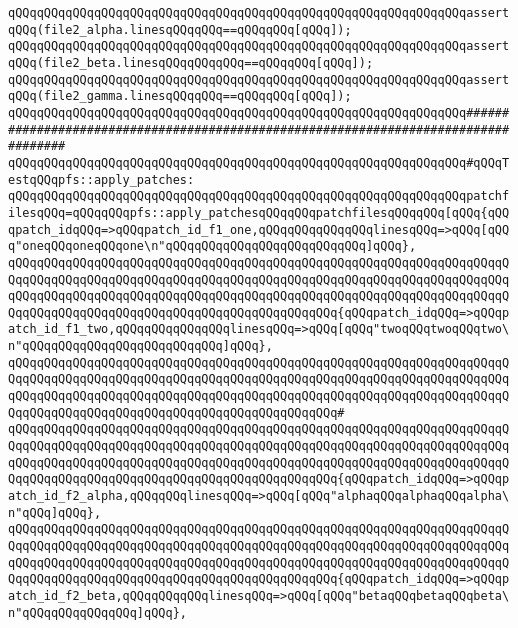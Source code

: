 \verb|qQQqqQQqqQQqqQQqqQQqqQQqqQQqqQQqqQQqqQQqqQQqqQQqqQQqqQQqqQQqqQQqassertqQQq(file2_alpha.linesqQQqqQQq==qQQqqQQq[qQQq]);|\newline
\verb|qQQqqQQqqQQqqQQqqQQqqQQqqQQqqQQqqQQqqQQqqQQqqQQqqQQqqQQqqQQqqQQqassertqQQq(file2_beta.linesqQQqqQQqqQQq==qQQqqQQq[qQQq]);|\newline
\verb|qQQqqQQqqQQqqQQqqQQqqQQqqQQqqQQqqQQqqQQqqQQqqQQqqQQqqQQqqQQqqQQqassertqQQq(file2_gamma.linesqQQqqQQq==qQQqqQQq[qQQq]);|\newline
\newline
\newline
\newline
\verb|qQQqqQQqqQQqqQQqqQQqqQQqqQQqqQQqqQQqqQQqqQQqqQQqqQQqqQQqqQQqqQQq####################################################################################|\newline
\verb|qQQqqQQqqQQqqQQqqQQqqQQqqQQqqQQqqQQqqQQqqQQqqQQqqQQqqQQqqQQqqQQq#qQQqTestqQQqpfs::apply_patches:|\newline
\newline
\verb|qQQqqQQqqQQqqQQqqQQqqQQqqQQqqQQqqQQqqQQqqQQqqQQqqQQqqQQqqQQqqQQqpatchfilesqQQq=qQQqqQQqpfs::apply_patchesqQQqqQQqpatchfilesqQQqqQQq[qQQq{qQQqpatch_idqQQq=>qQQqpatch_id_f1_one,qQQqqQQqqQQqqQQqlinesqQQq=>qQQq[qQQq"oneqQQqoneqQQqone\n"qQQqqQQqqQQqqQQqqQQqqQQqqQQq]qQQq},|\newline
\verb|qQQqqQQqqQQqqQQqqQQqqQQqqQQqqQQqqQQqqQQqqQQqqQQqqQQqqQQqqQQqqQQqqQQqqQQqqQQqqQQqqQQqqQQqqQQqqQQqqQQqqQQqqQQqqQQqqQQqqQQqqQQqqQQqqQQqqQQqqQQqqQQqqQQqqQQqqQQqqQQqqQQqqQQqqQQqqQQqqQQqqQQqqQQqqQQqqQQqqQQqqQQqqQQqqQQqqQQqqQQqqQQqqQQqqQQqqQQqqQQqqQQqqQQqqQQqqQQq{qQQqpatch_idqQQq=>qQQqpatch_id_f1_two,qQQqqQQqqQQqqQQqlinesqQQq=>qQQq[qQQq"twoqQQqtwoqQQqtwo\n"qQQqqQQqqQQqqQQqqQQqqQQqqQQq]qQQq},|\newline
\verb|qQQqqQQqqQQqqQQqqQQqqQQqqQQqqQQqqQQqqQQqqQQqqQQqqQQqqQQqqQQqqQQqqQQqqQQqqQQqqQQqqQQqqQQqqQQqqQQqqQQqqQQqqQQqqQQqqQQqqQQqqQQqqQQqqQQqqQQqqQQqqQQqqQQqqQQqqQQqqQQqqQQqqQQqqQQqqQQqqQQqqQQqqQQqqQQqqQQqqQQqqQQqqQQqqQQqqQQqqQQqqQQqqQQqqQQqqQQqqQQqqQQqqQQqqQQqqQQq#|\newline
\verb|qQQqqQQqqQQqqQQqqQQqqQQqqQQqqQQqqQQqqQQqqQQqqQQqqQQqqQQqqQQqqQQqqQQqqQQqqQQqqQQqqQQqqQQqqQQqqQQqqQQqqQQqqQQqqQQqqQQqqQQqqQQqqQQqqQQqqQQqqQQqqQQqqQQqqQQqqQQqqQQqqQQqqQQqqQQqqQQqqQQqqQQqqQQqqQQqqQQqqQQqqQQqqQQqqQQqqQQqqQQqqQQqqQQqqQQqqQQqqQQqqQQqqQQqqQQqqQQq{qQQqpatch_idqQQq=>qQQqpatch_id_f2_alpha,qQQqqQQqlinesqQQq=>qQQq[qQQq"alphaqQQqalphaqQQqalpha\n"qQQq]qQQq},|\newline
\verb|qQQqqQQqqQQqqQQqqQQqqQQqqQQqqQQqqQQqqQQqqQQqqQQqqQQqqQQqqQQqqQQqqQQqqQQqqQQqqQQqqQQqqQQqqQQqqQQqqQQqqQQqqQQqqQQqqQQqqQQqqQQqqQQqqQQqqQQqqQQqqQQqqQQqqQQqqQQqqQQqqQQqqQQqqQQqqQQqqQQqqQQqqQQqqQQqqQQqqQQqqQQqqQQqqQQqqQQqqQQqqQQqqQQqqQQqqQQqqQQqqQQqqQQqqQQqqQQq{qQQqpatch_idqQQq=>qQQqpatch_id_f2_beta,qQQqqQQqqQQqlinesqQQq=>qQQq[qQQq"betaqQQqbetaqQQqbeta\n"qQQqqQQqqQQqqQQq]qQQq},|\newline
